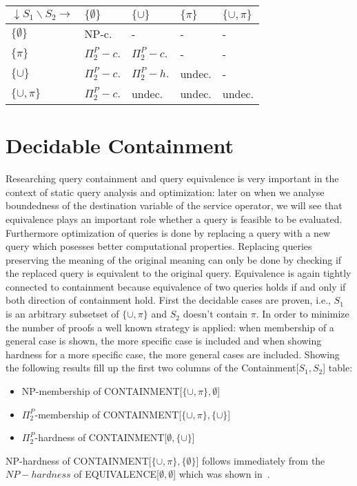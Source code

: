 \bigskip
\begin{table}[!ht]\label{equivtable}
\begin{tabular}{|l |  l | l | l | l|}
	\hline
	$\downarrow S_1 \backslash S_2 \rightarrow$ & $\{\emptyset\}$ &
	$\{\cup\}$& $\{\pi \}$ & $\{\cup,\pi \}$ \\
	\hline
	$\{\emptyset\}$			&  NP-c.				& -				 & -         & - \\
	$\{\pi \}$		&  $\Pi^P_2-c.$ 		& $\Pi^P_2-c.$   & -		 & - \\
	$\{\cup \}$		&  $\Pi^P_2-c.$ 		& $\Pi^P_2-h.$   & undec.    & - \\
	$\{\cup,\pi \}$&  $\Pi^P_2-c.$ 		& undec.         & undec.    & undec. \\
\hline
\end{tabular}
\end{table}


\section{Decidable Containment}

Researching query containment and query equivalence is very important in the
context of static query analysis and optimization: later on when we analyse
boundedness of the destination variable of the service operator, we will see
that equivalence plays an important role whether a query is feasible to be
evaluated. Furthermore optimization of queries is done by replacing a query with
a new query which posesses better computational properties. Replacing queries
preserving the meaning of the original meaning can only be done by checking if
the replaced query is equivalent to the original query. Equivalence is again
tightly connected to containment because equivalence of two queries holds if and
only if both direction of containment hold.
First the decidable cases are proven, i.e., $S_1$ is an arbitrary subsetset of
$\{\cup,\pi\}$ and $S_2$ doesn't contain $\pi$. 
In order to minimize the number of proofs a well known strategy is applied: when membership of a
general case is shown, the more specific case is included and when showing
hardness for a more specific case, the more general cases are included.  
Showing the following results fill up the first two columns of the
Containment[$S_1,S_2$] table:
\begin{itemize}
	\item NP-membership of CONTAINMENT[$\{\cup,\pi\},\emptyset$]
	\item $\Pi^P_2$-membership of CONTAINMENT[$\{\cup,\pi\},\{\cup\}$]
	\item $\Pi^P_2$-hardness of CONTAINMENT[$\emptyset,\{\cup\}$]
\end{itemize}
NP-hardness of CONTAINMENT[$\{\cup,\pi\},\{\emptyset\}$] follows immediately
from the $NP-hardness$ of EQUIVALENCE[$\emptyset,\emptyset$] which was shown
in~\cite{letelier2013static}.

